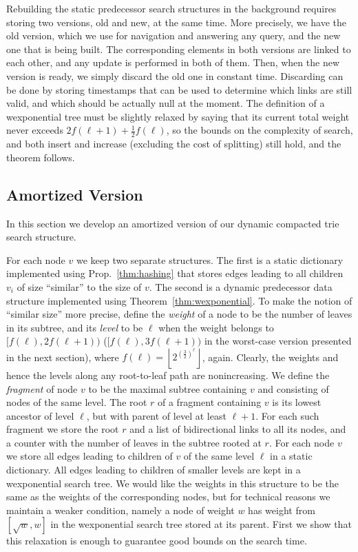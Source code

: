 \documentclass[11pt,onecolumn,final]{article} \usepackage{a4}
\theoremstyle{plain}
\theoremstyle{remark}
\begin{document}
Rebuilding the static predecessor search structures in the background requires storing two versions, old and new, at the same time. More precisely, we have the old version, which we use for navigation and answering any query, and the new one that is being built. The corresponding elements in both versions are linked to each other, and any update is performed in both of them. Then, when the new version is ready, we simply discard the old one in constant time. Discarding can be done by storing timestamps that can be used to determine which links are still valid, and which should be actually null at the moment. The definition of a wexponential tree must be slightly relaxed by saying that its current total weight never exceeds $2f(\ell+1)+\frac{1}{2}f(\ell)$, so the bounds on the complexity of search, and both insert and increase (excluding the cost of splitting) still hold, and the theorem follows.

\subsection{Amortized Version}
\label{sec:amortized search}

In this section we develop an amortized version of our dynamic compacted trie search structure.

For each node $v$ we keep two separate structures. The first is a static dictionary implemented using Prop.~\ref{thm:hashing} that stores edges leading to all children $v_{i}$ of size ``similar'' to the size of $v$. The second is a dynamic predecessor data structure implemented using Theorem~\ref{thm:wexponential}. To make the notion of ``similar size'' more precise, define the \emph{weight} of a node to be the number of leaves in its subtree, and its \emph{level} to be $\ell$ when the weight belongs to $[f(\ell),2f(\ell+1))$ ($[f(\ell),3f(\ell+1))$ in the worst-case version presented in the next section),
where $f(\ell)=\left\lfloor 2^{(\frac{3}{2})^{\ell}} \right\rfloor$, again. Clearly, the weights and hence the levels along any root-to-leaf path are nonincreasing. We define the \emph{fragment} of node $v$ to be the maximal subtree containing $v$ and consisting of nodes of the same level. The root $r$ of a fragment containing $v$ is its lowest ancestor of level $\ell$, but with parent of level at least $\ell+1$. For each such fragment we store the root $r$ and a list of bidirectional links to all its nodes, and a counter with the number of leaves in the subtree rooted at $r$. For each node $v$ we store all edges leading to children of $v$ of the same level $\ell$ in a static dictionary. All edges leading to children of smaller levels are kept in a wexponential search tree. We would like the weights in this structure to be the same as the weights of the corresponding nodes, but for technical reasons we maintain a weaker condition, namely a node of weight $w$ has weight from $[\sqrt{w},w]$ in the wexponential search tree stored at its parent. First we show that this relaxation is enough to guarantee good bounds on the search time.
\end{document}
